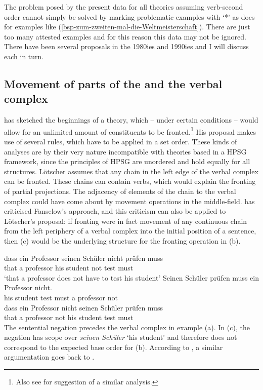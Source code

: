 The problem posed by the present data for all theories assuming verb-second order cannot simply be solved
by marking problematic examples with `*' as \citet[]{Bungarten73a} does for examples like
(\ref{bsp-zum-zweiten-mal-die-Weltmeisterschaft}). There are just too many attested examples and for
this reason this data may not be ignored. There have been several proposals in the 1980ies and
1990ies and I will discuss each in turn.

\subsection{Movement of parts of the \mf and the verbal complex}

\citet*{Loetscher85} has sketched the beginnings of a theory, which -- under certain conditions -- would allow
for an unlimited amount of constituents to be fronted.\footnote{
  Also see  for suggestion of a similar analysis.%
}
His proposal makes use of several rules, which have to be applied in a set order. These kinds of analyses are by their very nature
incompatible with theories based in a HPSG framework, since the principles of HPSG are unordered and hold equally for all structures.
Lötscher assumes that any chain in the left edge of the verbal complex can be fronted. These chains can contain verbs, which
would explain the fronting of partial projections. The adjacency of elements of the chain to the verbal complex could have come
about by movement operations in the middle-field. \citet[]{Duerscheid89a} has criticised Fanselow's \citeyearpar{Fanselow87a} approach,
and this criticism can also be applied to Lötscher's proposal: if fronting were in fact movement of any continuous chain from the left
periphery of a verbal complex into the initial position of a sentence, then (c) would be the underlying structure for the
fronting operation in (b).



\eal
\ex 
\gll dass ein Professor seinen Schüler nicht prüfen muss\\
     that a professor his student not test must\\
\glt `that a professor does not have to test his student'
\ex
\gll Seinen Schüler prüfen muss ein Professor nicht.\\
     his student test must a professor not\\
\ex 
\gll dass ein Professor nicht seinen Schüler prüfen muss\\
     that a   professor not   his student test must\\
\zl
The sentential negation precedes the verbal complex in example (a). In (c), the negation
has scope over \emph{seinen Schüler} `his student' and therefore does not correspond to the expected
base order for (b). According to \citet[]{Duerscheid89a}, a similar argumentation goes back to \citep{Thiersch86a}.

